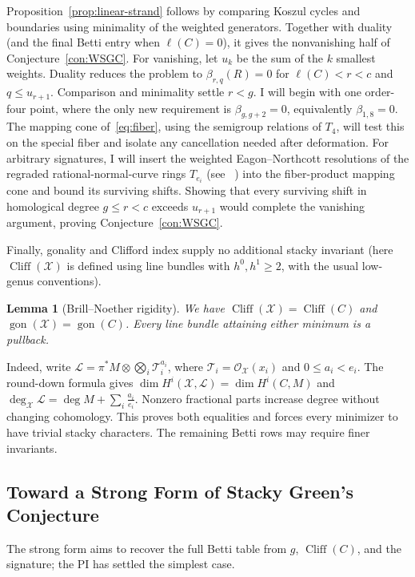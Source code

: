 \documentclass[11pt,reqno]{amsart}
\newtheorem{lemma}{Lemma}[section]
\theoremstyle{remark}
\newcommand{\gon}{\operatorname{gon}}
\newcommand{\cliff}{\operatorname{Cliff}}
\newcommand{\cL}{\mathcal{L}}
\newcommand{\cO}{\mathcal{O}}
\newcommand{\cT}{\mathcal{T}}
\newcommand{\cX}{\mathcal{X}}
\begin{document}
Proposition~\ref{prop:linear-strand} follows by comparing Koszul cycles and boundaries using minimality of the weighted generators. Together with duality (and the final Betti entry when $\ell(C)=0$), it gives the nonvanishing half of Conjecture~\ref{con:WSGC}. For vanishing, let $u_k$ be the sum of the $k$ smallest weights. Duality reduces the problem to $\beta_{r,q}(R)=0$ for $\ell(C)<r<c$ and $q\leq u_{r+1}$. Comparison and minimality settle $r<g$. I will begin with one order-four point, where the only new requirement is $\beta_{g,g+2}=0$, equivalently $\beta_{1,8}=0$. The mapping cone of~\eqref{eq:fiber}, using the semigroup relations of $T_4$, will test this on the special fiber and isolate any cancellation needed after deformation. For arbitrary signatures, I will insert the weighted Eagon--Northcott resolutions of the regraded rational-normal-curve rings $T_{e_i}$ (see ~\cite{davisSobieska25,banksRamkumar26}) into the fiber-product mapping cone and bound its surviving shifts. Showing that every surviving shift in homological degree $g\leq r<c$ exceeds $u_{r+1}$ would complete the vanishing argument, proving Conjecture~\ref{con:WSGC}.

Finally, gonality and Clifford index supply no additional stacky invariant (here $\cliff(\cX)$ is defined using line bundles with $h^0,h^1\geq2$, with the usual low-genus conventions).

\begin{lemma}[Brill--Noether rigidity]\label{prop:bn-rigidity}
We have $\cliff(\cX)=\cliff(C)$ and $\gon(\cX)=\gon(C)$. Every line bundle attaining either minimum is a pullback.
\end{lemma}

Indeed, write $\cL=\pi^*M\otimes\bigotimes_i\cT_i^{a_i}$, where $\cT_i=\cO_{\cX}(x_i)$ and $0\leq a_i<e_i$. The round-down formula gives $\dim H^i(\cX,\cL)=\dim H^i(C,M)$ and $\deg_{\cX}\cL=\deg M+\sum_i\frac{a_i}{e_i}$. Nonzero fractional parts increase degree without changing cohomology. This proves both equalities and forces every minimizer to have trivial stacky characters. The remaining Betti rows may require finer invariants.

\subsection{Toward a Strong Form of Stacky Green's Conjecture}\label{subsec:middle}

The strong form aims to recover the full Betti table from $g$, $\cliff(C)$, and the signature; the PI has settled the simplest case.
\end{document}
